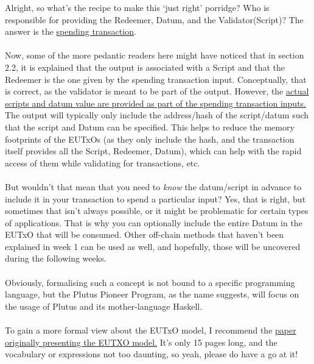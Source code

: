 \documentclass[a4paper, 11pt]{article}
\begin{document}
    Alright, so what's the recipe to make this `just right' porridge? Who is responsible for providing the Redeemer, Datum, and the Validator(Script)? The answer is the \ul{spending transaction}. 
    
    \paragraph{}Now, some of the more pedantic readers here might have noticed that in section 2.2, it is explained that the output is associated with a Script and that the Redeemer is the one given by the spending transaction input. Conceptually, that is correct, as the validator is meant to be part of the output. However, the \ul{actual scripts and datum value are provided as part of the spending transaction inputs.} The output will typically only include the address/hash of the script/datum such that the script and Datum can be specified. This helps to reduce the memory footprints of the EUTxOs (as they only include the hash, and the transaction itself provides all the Script, Redeemer, Datum), which can help with the rapid access of them while validating for transactions, etc.

    \paragraph{}But wouldn't that mean that you need to \emph{know} the datum/script in advance to include it in your transaction to spend a particular input? Yes, that is right, but sometimes that isn't always possible, or it might be problematic for certain types of applications. That is why you can optionally include the entire Datum in the EUTxO that will be consumed. Other off-chain methods that haven't been explained in week 1 can be used as well, and hopefully, those will be uncovered during the following weeks.

    \paragraph{} Obviously, formalising such a concept is not bound to a specific programming language, but the Plutus Pioneer Program, as the name suggests, will focus on the usage of Plutus and its mother-language Haskell. 

    \paragraph{} To gain a more formal view about the EUTxO model, I recommend the \href{https://iohk.io/en/research/library/papers/the-extended-utxo-model/}{paper originally presenting the EUTXO model.} It's only 15 pages long, and the vocabulary or expressions not too daunting, so yeah, please do have a go at it!
    
\end{document}
